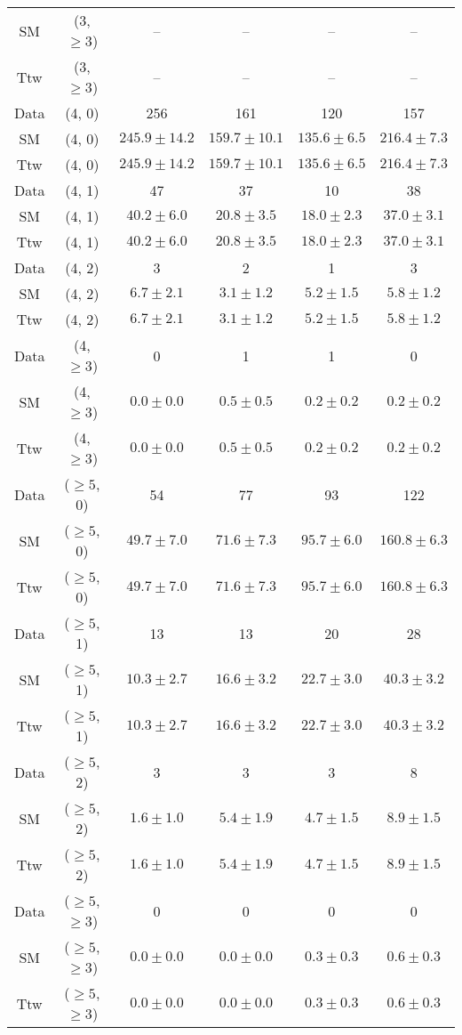 \begin{table}[h!]
{\begin{tabular}{cccccc}
	SM & (3, $\ge3$) & -- & -- & -- & -- \\[0.5ex] 
	Ttw & (3, $\ge3$) & -- & -- & -- & -- \\[0.5ex] 
	Data & (4, 0) & 256 & 161 & 120 & 157 \\[0.5ex] 
	SM & (4, 0) & $245.9\pm 14.2$ & $159.7\pm 10.1$ & $135.6\pm 6.5$ & $216.4\pm 7.3$ \\[0.5ex] 
	Ttw & (4, 0) & $245.9\pm 14.2$ & $159.7\pm 10.1$ & $135.6\pm 6.5$ & $216.4\pm 7.3$ \\[0.5ex] 
	Data & (4, 1) & 47 & 37 & 10 & 38 \\[0.5ex] 
	SM & (4, 1) & $40.2\pm 6.0$ & $20.8\pm 3.5$ & $18.0\pm 2.3$ & $37.0\pm 3.1$ \\[0.5ex] 
	Ttw & (4, 1) & $40.2\pm 6.0$ & $20.8\pm 3.5$ & $18.0\pm 2.3$ & $37.0\pm 3.1$ \\[0.5ex] 
	Data & (4, 2) & 3 & 2 & 1 & 3 \\[0.5ex] 
	SM & (4, 2) & $6.7\pm 2.1$ & $3.1\pm 1.2$ & $5.2\pm 1.5$ & $5.8\pm 1.2$ \\[0.5ex] 
	Ttw & (4, 2) & $6.7\pm 2.1$ & $3.1\pm 1.2$ & $5.2\pm 1.5$ & $5.8\pm 1.2$ \\[0.5ex] 
	Data & (4, $\ge3$) & 0 & 1 & 1 & 0 \\[0.5ex] 
	SM & (4, $\ge3$) & $0.0\pm 0.0$ & $0.5\pm 0.5$ & $0.2\pm 0.2$ & $0.2\pm 0.2$ \\[0.5ex] 
	Ttw & (4, $\ge3$) & $0.0\pm 0.0$ & $0.5\pm 0.5$ & $0.2\pm 0.2$ & $0.2\pm 0.2$ \\[0.5ex] 
	Data & ($\ge5$, 0) & 54 & 77 & 93 & 122 \\[0.5ex] 
	SM & ($\ge5$, 0) & $49.7\pm 7.0$ & $71.6\pm 7.3$ & $95.7\pm 6.0$ & $160.8\pm 6.3$ \\[0.5ex] 
	Ttw & ($\ge5$, 0) & $49.7\pm 7.0$ & $71.6\pm 7.3$ & $95.7\pm 6.0$ & $160.8\pm 6.3$ \\[0.5ex] 
	Data & ($\ge5$, 1) & 13 & 13 & 20 & 28 \\[0.5ex] 
	SM & ($\ge5$, 1) & $10.3\pm 2.7$ & $16.6\pm 3.2$ & $22.7\pm 3.0$ & $40.3\pm 3.2$ \\[0.5ex] 
	Ttw & ($\ge5$, 1) & $10.3\pm 2.7$ & $16.6\pm 3.2$ & $22.7\pm 3.0$ & $40.3\pm 3.2$ \\[0.5ex] 
	Data & ($\ge5$, 2) & 3 & 3 & 3 & 8 \\[0.5ex] 
	SM & ($\ge5$, 2) & $1.6\pm 1.0$ & $5.4\pm 1.9$ & $4.7\pm 1.5$ & $8.9\pm 1.5$ \\[0.5ex] 
	Ttw & ($\ge5$, 2) & $1.6\pm 1.0$ & $5.4\pm 1.9$ & $4.7\pm 1.5$ & $8.9\pm 1.5$ \\[0.5ex] 
	Data & ($\ge5$, $\ge3$) & 0 & 0 & 0 & 0 \\[0.5ex] 
	SM & ($\ge5$, $\ge3$) & $0.0\pm 0.0$ & $0.0\pm 0.0$ & $0.3\pm 0.3$ & $0.6\pm 0.3$ \\[0.5ex] 
	Ttw & ($\ge5$, $\ge3$) & $0.0\pm 0.0$ & $0.0\pm 0.0$ & $0.3\pm 0.3$ & $0.6\pm 0.3$ \\[0.5ex] 
	\hline
	\hline
\end{tabular}}
\end{table}
